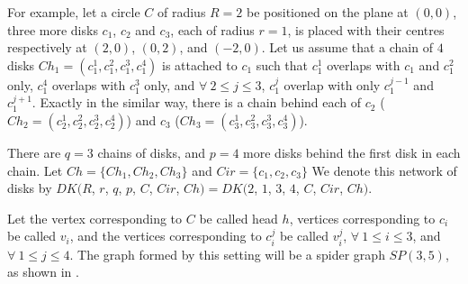 For example, let a circle $C$ of radius $R=2$ be positioned on the plane at $(0,0)$, three more disks $c_1$, $c_2$ and $c_3$, each of radius $r=1$, is placed with their centres respectively at $(2,0)$, $(0,2)$, and $(-2,0)$. Let us assume that a chain of $4$ disks $Ch_1=(c_1^1, c_1^2, c_1^3, c_1^4)$ is attached to $c_1$ such that $c_1^1$ overlaps with $c_1$ and $c_1^2$ only, $c_1^4$ overlaps with $c_1^3$ only, and $\forall\ 2 \leq j \leq 3$, $c_1^j$ overlap with only $c_1^{j-1}$ and $c_1^{j+1}$. Exactly in the similar way, there is a chain behind each of $c_2$ ($Ch_2=(c_2^1, c_2^2, c_2^3, c_2^4)$) and $c_3$ ($Ch_3=(c_3^1, c_3^2, c_3^3, c_3^4)$).

There are $q=3$ chains of disks, and $p=4$ more disks behind the first disk in each chain. Let $Ch = \{Ch_1, Ch_2, Ch_3\}$ and $Cir = \{c_1, c_2, c_3\}$ We denote this network of disks by $DK(R$, $r$, $q$, $p$, $C$, $Cir$, $Ch) = DK(2$, $1$, $3$, $4$, $C$, $Cir$, $Ch)$.

Let the vertex corresponding to $C$ be called head $h$, vertices corresponding to $c_i$ be called $v_i$, and the vertices corresponding to $c_i^j$ be called $v_i^j$, $\forall\ 1 \leq i \leq 3$, and $\forall\ 1 \leq j \leq 4$. The graph formed by this setting will be a spider graph $SP(3,5)$, as shown in .

